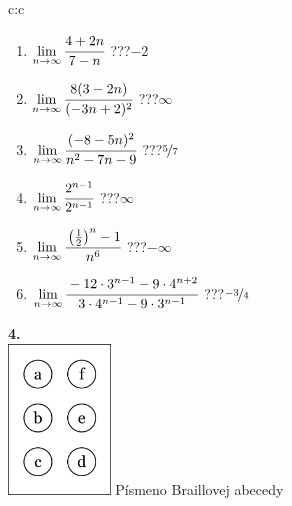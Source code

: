 \documentclass[10pt]{report}
\begin{document}
\begin{tabular}{c:c}
\begin{minipage}[c][104.5mm][t]{0.5\linewidth}
\begin{center}
\begin{minipage}{0.79\linewidth}
\begin{center}
\begin{varwidth}{\linewidth}
\begin{enumerate}
\normalsize
\item $\lim\limits_{n\to\infty}\cfrac{4+2n}{7-n}$\quad \dotfill\; ???\;\dotfill \quad $-2$
\item $\lim\limits_{n\to\infty}\cfrac{8(3-2n)}{(-3n+2)^2}$\quad \dotfill\; ???\;\dotfill \quad $\infty$
\item $\lim\limits_{n\to\infty}\cfrac{(-8-5n)^2}{n^2-7n-9}$\quad \dotfill\; ???\;\dotfill \quad $\nicefrac{5}{7}$
\item $\lim\limits_{n\to\infty}\cfrac{2^{n-1}}{2^{n-1}}$\quad \dotfill\; ???\;\dotfill \quad $\infty$
\item $\lim\limits_{n\to\infty}\cfrac{\left(\frac{1}{2}\right)^n -1}{n^{6}}$\quad \dotfill\; ???\;\dotfill \quad $-\infty$
\item $\lim\limits_{n\to\infty}\cfrac{-12\cdot 3^{n-1}-9\cdot 4^{n+2}}{3\cdot 4^{n-1}-9\cdot 3^{n-1}}$\quad \dotfill\; ???\;\dotfill \quad $\nicefrac{-3}{4}$
\end{enumerate}
\end{varwidth}
\end{center}
\end{minipage}
\begin{minipage}{0.20\linewidth}
\begin{center}
{\Huge\bfseries 4.} \\[2mm]
\includegraphics[height=40mm]{../images/braille.png}
{\small Písmeno Braillovej abecedy}
\end{center}
\end{minipage}
\end{center}
\end{minipage}
%
\end{tabular}
\newpage
\end{document}
